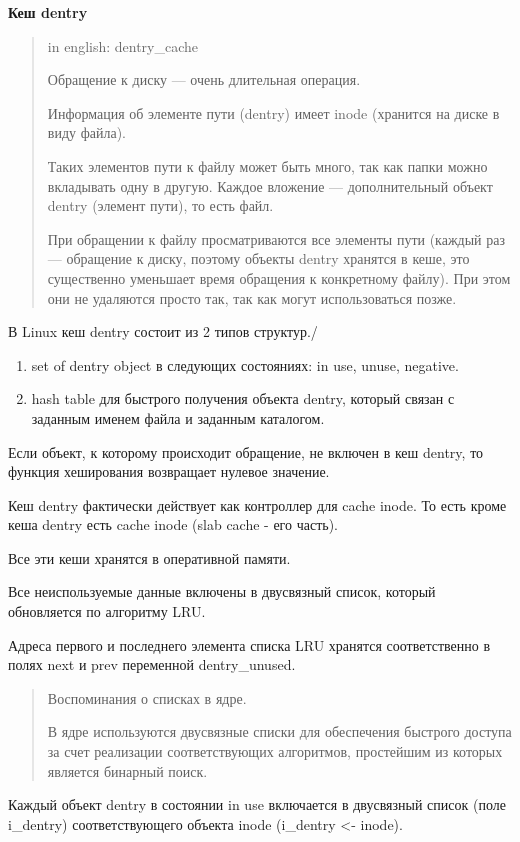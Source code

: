 \textbf{Кеш dentry}

\begin{quote}
in english: dentry\_cache

Обращение к диску — очень длительная операция. 

Информация об элементе пути (dentry) имеет inode (хранится на диске в виду файла).

Таких элементов пути к файлу может быть много, так как папки можно вкладывать одну в другую. Каждое вложение — дополнительный объект dentry (элемент пути), то есть файл.

При обращении к файлу просматриваются все элементы пути (каждый раз — обращение к диску, поэтому объекты dentry хранятся в кеше, это существенно уменьшает время обращения к конкретному файлу). При этом они не удаляются просто так, так как могут использоваться позже.
\end{quote}

В Linux кеш dentry состоит из 2 типов структур./
\begin{enumerate}
\item set of dentry object в следующих состояниях: in use, unuse, negative.
\item hash table для быстрого получения объекта dentry, который связан с заданным именем файла и заданным каталогом.
\end{enumerate}

Если объект, к которому происходит обращение, не включен в кеш dentry, то функция хеширования возвращает нулевое значение.

Кеш dentry фактически действует как контроллер для cache inode. То есть кроме кеша dentry есть cache inode (slab cache - его часть).

Все эти кеши хранятся в оперативной памяти.

Все неиспользуемые данные включены в двусвязный список, который обновляется по алгоритму LRU.

Адреса первого и последнего элемента списка LRU хранятся соответственно в полях next и prev переменной dentry\_unused.

\begin{quote}
Воспоминания о списках в ядре.

В ядре используются двусвязные списки для обеспечения быстрого доступа за счет реализации соответствующих алгоритмов, простейшим из которых является бинарный поиск.
\end{quote}

Каждый объект dentry в состоянии in use включается в двусвязный список (поле i\_dentry) соответствующего объекта inode (i\_dentry <- inode).


